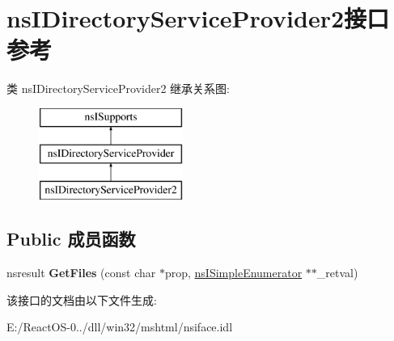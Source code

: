 \hypertarget{interfacens_i_directory_service_provider2}{}\section{ns\+I\+Directory\+Service\+Provider2接口 参考}
\label{interfacens_i_directory_service_provider2}
类 ns\+I\+Directory\+Service\+Provider2 继承关系图\+:\begin{figure}[H]
\begin{center}
\leavevmode
\includegraphics[height=3.000000cm]{interfacens_i_directory_service_provider2}
\end{center}
\end{figure}
\subsection*{Public 成员函数}
\begin{DoxyCompactItemize}
\item 
\mbox{\label{interfacens_i_directory_service_provider2_a83074d6c8521c4c24cee9a76c3ab7932}} 
nsresult {\bfseries Get\+Files} (const char $\ast$prop, \hyperlink{interfacens_i_simple_enumerator}{ns\+I\+Simple\+Enumerator} $\ast$$\ast$\+\_\+retval)
\end{DoxyCompactItemize}


该接口的文档由以下文件生成\+:\begin{DoxyCompactItemize}
\item 
E\+:/\+React\+O\+S-\/0../dll/win32/mshtml/nsiface.\+idl\end{DoxyCompactItemize}
